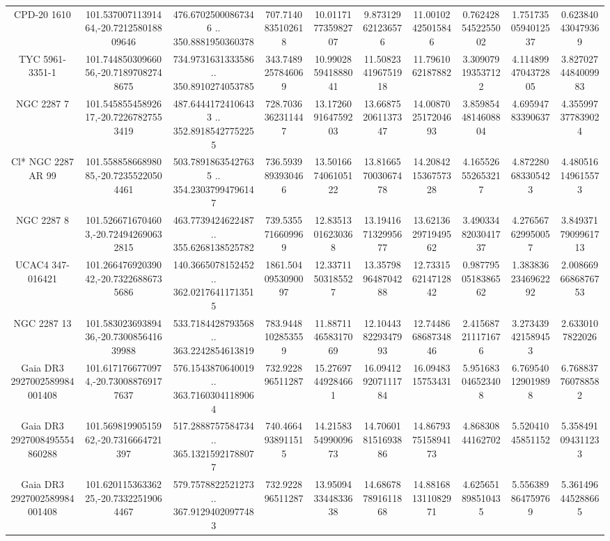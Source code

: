 \begin{table}
\begin{tabular}{cccccccccc}
CPD-20  1610 & 101.53700711391464,-20.721258018809646 & 476.67025000867346 .. 350.8881950360378 & 707.7140835102618 & 10.011717735982707 & 9.873129621236576 & 11.00102425015846 & 0.7624285452255002 & 1.7517350594012537 & 0.623840430479369 \\
TYC 5961-3351-1 & 101.74485030966056,-20.71897082748675 & 734.9731631333586 .. 350.8910274053785 & 343.7489257846069 & 10.990285941888041 & 11.508234196751918 & 11.7961062187882 & 3.309079193537122 & 4.1148994704372805 & 3.8270274484009983 \\
NGC  2287     7 & 101.54585545892617,-20.72267827553419 & 487.64441724106433 .. 352.89185427752255 & 728.7036362311447 & 13.172609164759203 & 13.668752061137347 & 14.008702517204693 & 3.8598544814608804 & 4.69594783390637 & 4.355997377839024 \\
Cl* NGC 2287     AR      99 & 101.55885866898085,-20.72355220504461 & 503.78918635427635 .. 354.23037994796147 & 736.5939893930466 & 13.501667406105122 & 13.816657003067478 & 14.208421536757328 & 4.165526552653217 & 4.872280683305423 & 4.480516149615573 \\
NGC  2287     8 & 101.5266716704603,-20.724942690632815 & 463.7739424622487 .. 355.6268138525782 & 739.5355716609969 & 12.83513016230368 & 13.194167132995677 & 13.621362971949562 & 3.4903348203041737 & 4.276567629950057 & 3.8493717909961713 \\
UCAC4 347-016421 & 101.26647692039042,-20.73226886735686 & 140.3665078152452 .. 362.02176411713515 & 1861.5040953090097 & 12.33711503185527 & 13.357989648704288 & 12.733156214712842 & 0.9877950518386562 & 1.3838362346962292 & 2.0086696686876753 \\
NGC  2287    13 & 101.58302369389436,-20.730085641639988 & 533.7184428793568 .. 363.2242854613819 & 783.9448102853559 & 11.887114658317069 & 12.104438229347993 & 12.744866868734846 & 2.415687211171676 & 3.273439421589453 & 2.6330107822026 \\
Gaia DR3 2927002589984001408 & 101.6171766770974,-20.730088769177637 & 576.1543870640019 .. 363.71603041189064 & 732.922896511287 & 15.27697449284661 & 16.094129207111784 & 16.0948315753431 & 5.951683046523408 & 6.769540129019898 & 6.768837760788582 \\
Gaia DR3 2927008495554860288 & 101.56981990515962,-20.7316664721397 & 517.2888757584734 .. 365.13215921788077 & 740.4664938911515 & 14.215835499009673 & 14.706018151693886 & 14.867937515894173 & 4.86830844162702 & 5.52041045851152 & 5.358491094311233 \\
Gaia DR3 2927002589984001408 & 101.62011536336225,-20.73322519064467 & 579.7578822521273 .. 367.91294020977483 & 732.922896511287 & 13.950943344833638 & 14.686787891611868 & 14.881681311082971 & 4.625651898510435 & 5.556389864759769 & 5.361496445288665 \\

\end{tabular}
\end{table}
